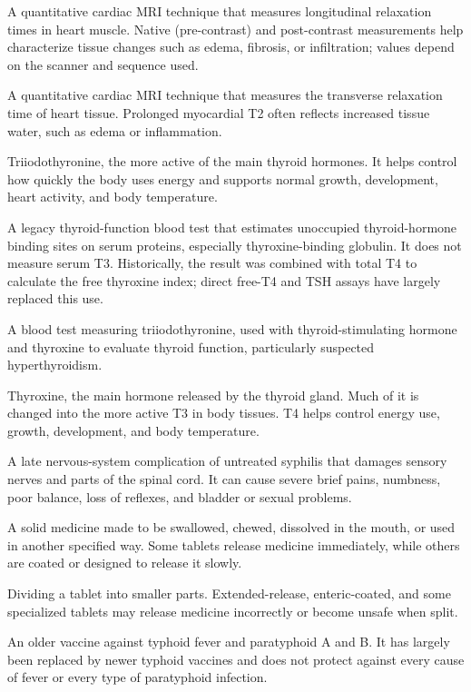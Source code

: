  A quantitative cardiac MRI technique that measures longitudinal relaxation times in heart muscle. Native (pre-contrast) and post-contrast measurements help characterize tissue changes such as edema, fibrosis, or infiltration; values depend on the scanner and sequence used.

 A quantitative cardiac MRI technique that measures the transverse relaxation time of heart tissue. Prolonged myocardial T2 often reflects increased tissue water, such as edema or inflammation.

 Triiodothyronine, the more active of the main thyroid hormones. It helps control how quickly the body uses energy and supports normal growth, development, heart activity, and body temperature.

 A legacy thyroid-function blood test that estimates unoccupied thyroid-hormone binding sites on serum proteins, especially thyroxine-binding globulin. It does not measure serum T3. Historically, the result was combined with total T4 to calculate the free thyroxine index; direct free-T4 and TSH assays have largely replaced this use.

 A blood test measuring triiodothyronine, used with thyroid-stimulating hormone and thyroxine to evaluate thyroid function, particularly suspected hyperthyroidism.

 Thyroxine, the main hormone released by the thyroid gland. Much of it is changed into the more active T3 in body tissues. T4 helps control energy use, growth, development, and body temperature.

 A late nervous-system complication of untreated syphilis that damages sensory nerves and parts of the spinal cord. It can cause severe brief pains, numbness, poor balance, loss of reflexes, and bladder or sexual problems.

 A solid medicine made to be swallowed, chewed, dissolved in the mouth, or used in another specified way. Some tablets release medicine immediately, while others are coated or designed to release it slowly.

 Dividing a tablet into smaller parts. Extended-release, enteric-coated, and some specialized tablets may release medicine incorrectly or become unsafe when split.

 An older vaccine against typhoid fever and paratyphoid A and B. It has largely been replaced by newer typhoid vaccines and does not protect against every cause of fever or every type of paratyphoid infection.


